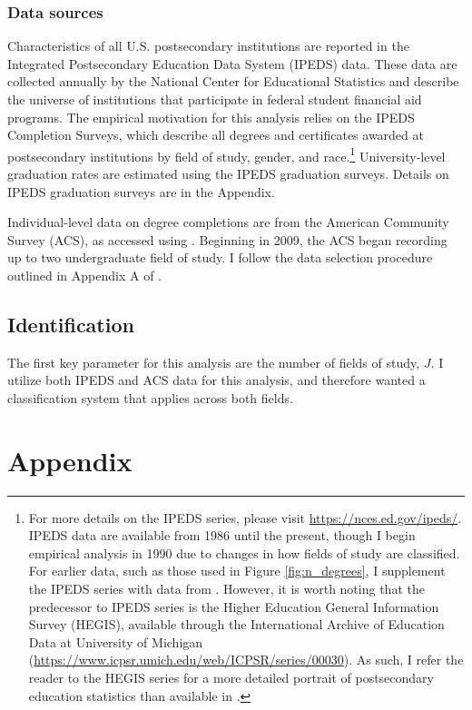 \documentclass[11 pt]{article}
\begin{document}
\subsubsection*{Data sources}

Characteristics of all U.S. postsecondary institutions are reported in the Integrated Postsecondary Education Data System (IPEDS) data.
These data are collected annually by the National Center for Educational Statistics and describe the universe of institutions that participate in federal student financial aid programs. 
The empirical motivation for this analysis relies on the IPEDS Completion Surveys, which describe all degrees and certificates awarded at postsecondary institutions by field of study, gender, and race.\footnote{
    For more details on the IPEDS series, please visit \url{https://nces.ed.gov/ipeds/}.
    IPEDS data are available from 1986 until the present, though I begin empirical analysis in 1990 due to changes in how fields of study are classified.
    For earlier data, such as those used in Figure \ref{fig:n_degrees}, I supplement the IPEDS series with data from \textcite{S93}.
    However, it is worth noting that the predecessor to IPEDS series is the Higher Education General Information Survey (HEGIS), available through the International Archive of Education Data at University of Michigan (\url{https://www.icpsr.umich.edu/web/ICPSR/series/00030}). As such, I refer the reader to the HEGIS series for a more detailed portrait of postsecondary education statistics than available in \textcite{S93}.
}
University-level graduation rates are estimated using the IPEDS graduation surveys. 
Details on IPEDS graduation surveys are in the Appendix. 


Individual-level data on degree completions are from the American Community Survey (ACS), as accessed using \textcite{IPUMS}.
Beginning in 2009, the ACS began recording up to two undergraduate field of study. 
I follow the data selection procedure outlined in Appendix A of \textcite{SHB19}.


\subsection{Identification}

The first key parameter for this analysis are the number of fields of study, $J$. 
I utilize both IPEDS and ACS data for this analysis, and therefore wanted a classification system that applies across both fields. 

% 

\section*{Appendix}
\setcounter{table}{0}
\renewcommand{\thetable}{A\arabic{table}}




\printbibliography
\end{document}
